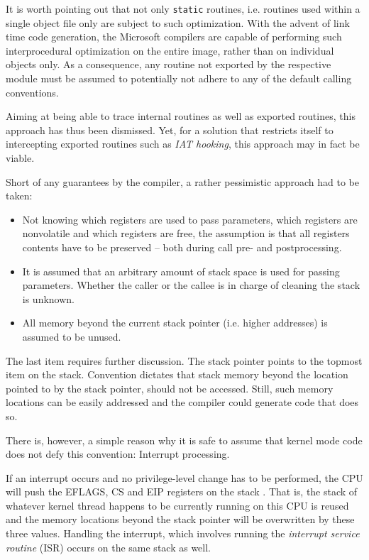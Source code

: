 It is worth pointing out that not only \verb|static| routines, i.e. routines
used within a single object file only are subject to such optimization. With the advent
of link time code generation, the Microsoft compilers are capable of performing such 
interprocedural optimization on the entire image, rather than on individual objects only.
As a consequence, any routine not exported by the respective module must be assumed
to potentially not adhere to any of the default calling conventions.

Aiming at being able to trace internal routines as well as exported routines, 
this approach has thus been dismissed. Yet, for a solution that restricts itself
to intercepting exported routines such as \emph{IAT hooking}, this approach may
in fact be viable.

Short of any guarantees by the compiler, a rather pessimistic approach had to be
taken:
\begin{itemize}
	\item	Not knowing which registers are used to pass parameters, which
				registers are nonvolatile and which registers are free, the assumption is that
				all registers contents have to be preserved -- both during call pre- and 
				postprocessing.
	\item It is assumed that an arbitrary amount of stack space is used for passing
				parameters. Whether the caller or the callee is in charge of cleaning the 
				stack is unknown.
	\item All memory beyond the current stack pointer (i.e. higher addresses)
				is assumed to be unused.
\end{itemize}

The last item requires further discussion. The stack pointer points to the
topmost item on the stack. Convention dictates that stack memory 
beyond the location pointed to by the stack pointer, should not be accessed.
Still, such memory locations can be easily addressed and the compiler could 
generate code that does so.

There is, however, a simple reason why it is safe to assume that kernel 
mode code does not defy this convention: Interrupt processing. 

If an interrupt occurs and no privilege-level change has to be performed,
the CPU will push the EFLAGS, CS and EIP registers on the stack \cite{intel07_1}. That is,
the stack of whatever kernel thread happens to be currently running on this CPU is reused
and the memory locations beyond the stack pointer will be overwritten by these
three values. Handling the interrupt, which involves running the \emph{interrupt
service routine} (ISR) occurs on the same stack as well.

